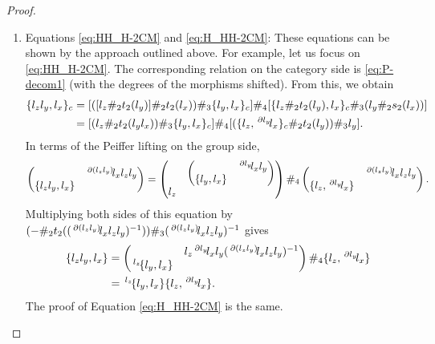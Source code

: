 \documentclass[11pt, reqno]{amsart} %
\newcommand{\act}[1]{\,\sp{#1}\!}
\theoremstyle{definition}
\theoremstyle{remark}
\numberwithin{equation}{section}
\begin{document}
\begin{proof}
\begin{enumerate}
\begin{align*}
    &= [(m\#_3t_3(m'))\#_4(s_3(m)\#_3m')\#_4m^{-1_4}]\#_3t_3(m)^{-1_3} \\
    &= [(mm')\#_3t_3(m)^{-1_3}]\#_4m^{-1} \displaybreak[1] \\
    &= mm'm^{-1} = (\text{R.H.S}).
  \end{align*}
  \item Equations \eqref{eq:HH_H-2CM} and \eqref{eq:H_HH-2CM}: These equations can be shown by the approach outlined above. For example, let us focus on \eqref{eq:HH_H-2CM}. The corresponding relation on the category side is \eqref{eq:P-decom1} (with the degrees of the morphisms shifted). From this, we obtain
  \begin{align*}
    \{l_zl_y,l_x\}_c &= [([l_z\#_2t_2(l_y)]\#_2t_2(l_x))\#_3\{l_y,l_x\}_c]\#_4[\{l_z\#_2t_2(l_y),l_x\}_c\#_3(l_y\#_2s_2(l_x))] \\
    &= [(l_z\#_2t_2(l_yl_x))\#_3\{l_y,l_x\}_c]\#_4[(\{l_z,\act{\partial l_y}l_x\}_c\#_2t_2(l_y))\#_3l_y].
  \end{align*}
  In terms of the Peiffer lifting on the group side,
  \[
    \begin{pmatrix}& \act{\partial (l_zl_y)}l_xl_zl_y \\ \{l_zl_y,l_x\} &\end{pmatrix} 
    = 
    \begin{pmatrix}&\begin{pmatrix} & \act{\partial l_y}l_xl_y \\ \{l_y,l_x\} &\end{pmatrix} \\ l_z &\end{pmatrix}
    \#_4
    \begin{pmatrix}& \act{\partial (l_zl_y)}l_xl_zl_y \\ \{l_z,\act{\partial l_y}l_x\}\end{pmatrix}.
  \]
  Multiplying both sides of this equation by $(-\#_2t_2((\act{\partial(l_zl_y)}l_xl_zl_y)^{-1}))\#_3(\act{\partial(l_zl_y)}l_xl_zl_y)^{-1}$ gives
  \begin{align*}
    \{l_zl_y,l_x\}
    &= 
    \begin{pmatrix} & l_z\act{\partial l_y}l_xl_y(\act{\partial (l_zl_y)}l_xl_zl_y)^{-1}\\ \act{l_z}\{l_y,l_x\}&\end{pmatrix}
    \#_4 \{l_z,\act{\partial l_y}l_x\} \\
    &= \act{l_z}\{l_y,l_x\}\{l_z,\act{\partial l_y}l_x\}.
  \end{align*}
  The proof of Equation \eqref{eq:H_HH-2CM} is the same.

\end{enumerate}
\end{proof}
\end{document}

